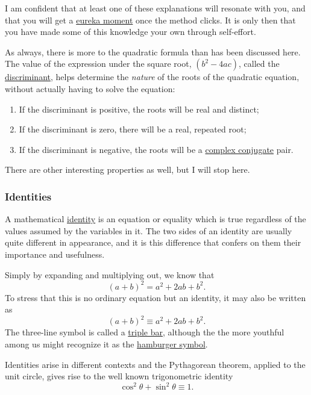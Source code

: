 \documentclass[
  a4paper,
]{article}
\begin{document}
I am confident that at least one of these explanations will resonate
with you, and that you will get a
\href{https://nesslabs.com/eureka-moments}{eureka moment} once the
method clicks. It is only then that you have made some of this knowledge
your own through self-effort.

As always, there is more to the quadratic formula than has been
discussed here. The value of the expression under the square root,
\((b^2 - 4ac)\), called the
\href{https://www.britannica.com/science/discriminant}{discriminant},
helps determine the \emph{nature} of the roots of the quadratic
equation, without actually having to solve the equation:

\begin{enumerate}
\def\labelenumi{\alph{enumi}.}
\item
  If the discriminant is positive, the roots will be real and distinct;
\item
  If the discriminant is zero, there will be a real, repeated root;
\item
  If the discriminant is negative, the roots will be a
  \href{https://www.mathcentre.ac.uk/resources/sigma\%20complex\%20number\%20leaflets/sigma-complex6-2009-1.pdf}{complex
  conjugate} pair.
\end{enumerate}

There are other interesting properties as well, but I will stop here.

\subsubsection{Identities}\label{identities}

A mathematical
\href{https://en.wikipedia.org/wiki/Identity_(mathematics)}{identity} is
an equation or equality which is true regardless of the values assumed
by the variables in it. The two sides of an identity are usually quite
different in appearance, and it is this difference that confers on them
their importance and usefulness.

Simply by expanding and multiplying out, we know that \[
(a+b)^2 = a^2 +2ab + b^2. 
\] To stress that this is no ordinary equation but an identity, it may
also be written as \[
(a+b)^2 \equiv a^2 +2ab + b^2.
\] The three-line symbol is called a
\href{https://en.wikipedia.org/wiki/Triple_bar}{triple bar}, although
the the more youthful among us might recognize it as the
\href{https://en.wikipedia.org/wiki/Hamburger_button}{hamburger symbol}.

Identities arise in different contexts and the Pythagorean theorem,
applied to the unit circle, gives rise to the well known trigonometric
identity \[
\cos^2\theta + \sin^2\theta \equiv 1.
\]
\end{document}
